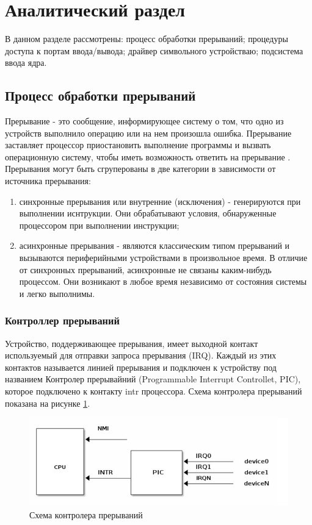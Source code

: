 \newpage
\section{Аналитический раздел}
В данном разделе рассмотрены: процесс обработки прерываний;
процедуры доступа к портам ввода/вывода;
драйвер символьного устройстваю;
подсистема ввода ядра.

\subsection{Процесс обработки прерываний}
Прерывание - это сообщение, информирующее систему о том, что одно из устройств выполнило операцию или на нем произошла ошибка. 
Прерывание заставляет процессор приостановить выполнение программы и вызвать операционную систему, чтобы иметь возможность ответить на прерывание \cite{3}.
Прерывания могут быть сгруперованы в две категории в зависимости от источника прерывания:
\begin{enumerate}
	\item синхронные прерывания или внутренние (исключения) - генерируются при выполнении иснтрукции.
	Они обрабатывают условия, обнаруженные процессором при выполнении инструкции;
	\item асинхронные прерывания - являются классическим типом прерываний и вызываются периферийными устройствами в произвольное время. 
	В отличие от синхронных прерываний, асинхронные не связаны каким-нибудь процессом. 
	Они возникают в любое время независимо от состояния системы и легко выполнимы.
\end{enumerate}

\subsubsection{Контроллер прерываний}
Устройство, поддерживающее прерывания, имеет выходной контакт используемый для отправки запроса прерывания (IRQ). 
Каждый из этих контактов называется линией прерывания и подключен к устройству под названием Контролер прерывайний (Programmable Interrupt Controllet, PIC), которое подключено к контакту intr процессора. Схема контролера прерываний показана на рисунке \ref{fig:interupt-device}.

\begin{figure}[H]
	\centering
	\includegraphics[width=0.7\linewidth]{"src/img/interupt device"}
	\caption{Схема контролера прерываний}
	\label{fig:interupt-device}
\end{figure}


